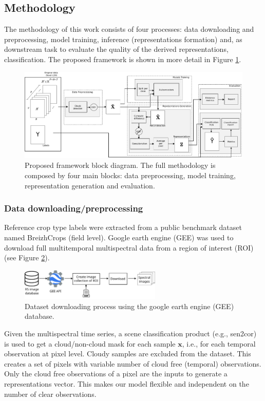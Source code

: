 \documentclass[journal,article,submit,pdftex,moreauthors]{Definitions/mdpi}
\begin{document}
\subsection{Methodology}
The methodology of this work consists of four processes: data downloading and preprocessing, model training, inference (representations formation) and, as downstream task to evaluate the quality of the derived representations, classification. The proposed framework is shown in more detail in Figure \ref{abstract}.
\begin{figure}[H]
	\centering
	\includegraphics[width=\textwidth]{figures/abstract.pdf}
	\caption{Proposed framework block diagram. The full methodology is composed by four main blocks: data preprocessing, model training, representation generation and evaluation.} 
	\label{abstract}
\end{figure}
\subsubsection{Data downloading/preprocessing}\label{data_preprocessing}
Reference crop type labels were extracted from a public benchmark dataset named BreizhCrops \cite{Russwurm2020} (field level).
Google earth engine (GEE) was used to download full multitemporal multispectral data from a region of interest (ROI) (see Figure \ref{GEE_process}). \\
\begin{figure}[H]
	\centering
	\includegraphics[width=0.6\textwidth]{figures/gee_download.pdf}
	\caption{Dataset downloading process using the google earth engine (GEE) database.}
	\label{GEE_process}    
\end{figure}

Given the multispectral time series, a scene classification product (e.g., sen2cor) is used to get a cloud/non-cloud mask for each sample $\mathbf{x}$, i.e., for each temporal observation at pixel level.
Cloudy samples are excluded from the dataset. This creates a set of pixels with variable number of cloud free (temporal) observations. Only the cloud free observations of a pixel are the inputs to generate a representations vector. This makes our model flexible and independent on the number of clear observations.
\end{document}

